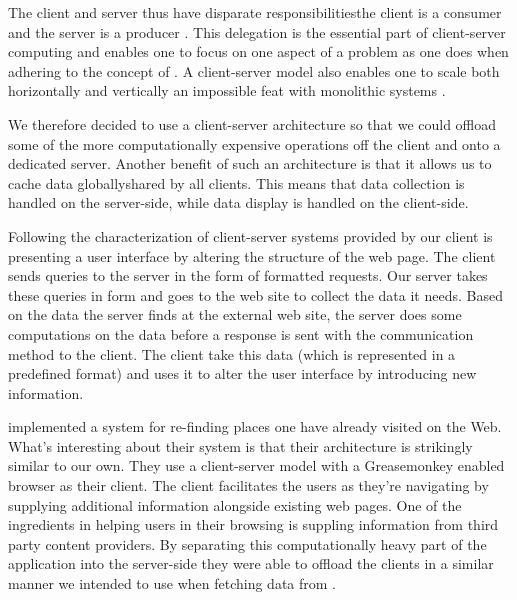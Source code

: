 The client and server thus have disparate responsibilities\dash{}the client is
a consumer and the server is a producer \citep[]{lewandowski98}.
This delegation is the
essential part of client-server computing and enables one to focus on one
aspect of a problem as one does when adhering to the concept of
 \citep[]{dijkstra82}.
A client-server model also enables one to scale both horizontally and
vertically%
\dash{}an
impossible feat with monolithic systems \citep[]{lewandowski98}.

We therefore decided to use a client-server architecture so that we could
offload some of the more computationally expensive operations off the client
and onto a dedicated server. Another benefit of such an architecture is that
it allows us to cache data globally\dash{}shared by all clients. This means
that data collection is handled on the server-side, while data display
is handled on the client-side.

Following the characterization of client-server systems provided by
\citeauthor{sinha92} our client is presenting a user interface
by altering the structure of the \urort{} web page. The client sends queries
to the server in the form of %
formatted requests. Our server takes these queries in  form
and goes to the \urort{} web site to collect the data it needs. Based on the
data the server finds at the external \urort{} web site, the server does some
computations on the data before a response is sent
with the  communication method to the client. The client take this
data (which is represented in a predefined format) and uses it to alter the
user interface by introducing new information.

\citet[--888]{nishimoto06} implemented a system for re-finding places
one have already visited on the Web. What's interesting about their system is
that their architecture is strikingly similar to our own. They use a
client-server model with a Greasemonkey enabled browser as their client. The
client facilitates the users as they're navigating by supplying additional
information alongside existing web pages. One of the ingredients in helping
users in their browsing is suppling information from third party content
providers. By separating this computationally heavy part of the application
into the server-side they were able to offload the clients in a similar
manner we intended to use when fetching data from \urort{}.

